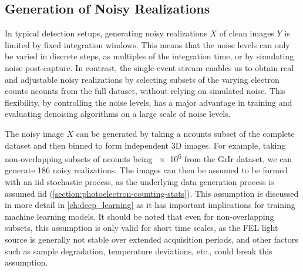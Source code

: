 \subsection{Generation of Noisy Realizations}
In typical detection setups, generating noisy realizations $X$ of clean images $Y$ is limited by fixed integration windows. This means that the noise levels can only be varied in discrete steps, as multiples of the integration time, or by simulating noise post-capture. In contrast, the single-event stream enables us to obtain real and adjustable noisy realizations by selecting subsets of the varying electron counts \gls{ncounts} from the full dataset, without relying on simulated noise. This flexibility, by controlling the noise levels, has a major advantage in training and evaluating denoising algorithms on a large scale of noise levels.

The noisy image $X$ can be generated by taking a \gls{ncounts} subset of the complete dataset and then binned to form independent 3D images. For example, taking non-overlapping subsets of \gls{ncounts} being \num{e6} from the \gls{GrIr} dataset, we can generate \num{186} noisy realizations. The images can then be assumed to be formed with an \gls{iid} stochastic process, as the underlying data generation process is assumed \gls{iid} (\cref{section:photoelectron-counting-stats}). This assumption is discussed in more detail in \cref{ch:deep_learning} as it has important implications for training machine learning models. It should be noted that even for non-overlapping subsets, this assumption is only valid for short time scales, as the \gls{FEL} light source is generally not stable over extended acquisition periods, and other factors such as sample degradation, temperature deviations, etc., could break this assumption.


